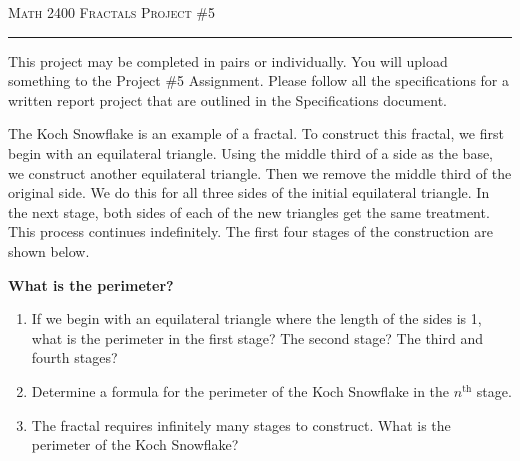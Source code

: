 \documentclass[12pt]{amsart}
\begin{document}
\thispagestyle{empty}

{\scshape Math 2400} \hfill {\scshape \large Fractals} \hfill {\scshape Project \#5}
 
\smallskip

\hrule

\bigskip

This project may be completed in pairs or individually.  You will upload something to the Project \#5 Assignment.  Please follow all the specifications for a written report project that are outlined in the Specifications document.

\bigskip

\bigskip

The Koch Snowflake is an example of a fractal.  To construct this fractal, we first begin with an equilateral triangle.  Using the middle third of a side as the base, we construct another equilateral triangle.  Then we remove the middle third of the original side.  We do this for all three sides of the initial equilateral triangle.  In the next stage, both sides of each of the new triangles get the same treatment.  This process continues indefinitely.  The first four stages of the construction are shown below.

\bigskip


\vfill

{\bf What is the perimeter?}

\medskip

\begin{enumerate}

\item  If we begin with an equilateral triangle where the length of the sides is 1, what is the perimeter in the first stage?  The second stage?  The third and fourth stages?

\bigskip

\item  Determine a formula for the perimeter of the Koch Snowflake in the $n^\text{th}$ stage.

\bigskip

\item  The fractal requires infinitely many stages to construct.  What is the perimeter of the Koch Snowflake?

\bigskip

\end{enumerate}
\end{document}
